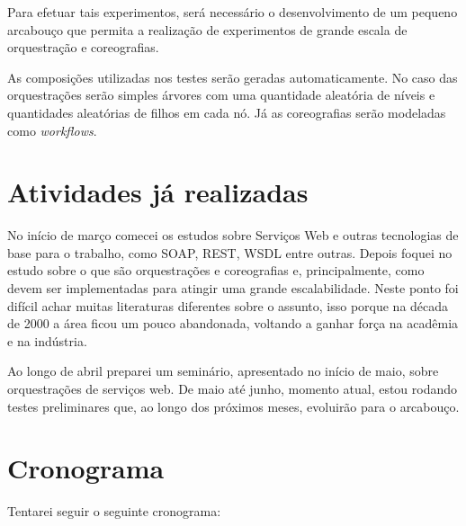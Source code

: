 \documentclass[11pt,a4paper]{article}
\begin{document}
Para efetuar tais experimentos, será necessário o desenvolvimento de um pequeno arcabouço que permita a realização de experimentos de grande escala de orquestração e coreografias. 

As composições utilizadas nos testes serão geradas automaticamente. No caso das orquestrações serão simples árvores com uma quantidade aleatória de níveis e quantidades aleatórias de filhos em cada nó. Já as coreografias serão modeladas como \textit{workflows}.

\section{Atividades já realizadas}
No início de março comecei os estudos sobre Serviços Web e outras tecnologias de base para o trabalho, como SOAP, REST, WSDL entre outras. Depois foquei no estudo sobre o que são orquestrações e coreografias e, principalmente, como devem ser implementadas para atingir uma grande escalabilidade. Neste ponto foi difícil achar muitas literaturas diferentes sobre o assunto, isso porque na década de 2000 a área ficou um pouco abandonada, voltando a ganhar força na acadêmia e na indústria.

Ao longo de abril preparei um seminário, apresentado no início de maio, sobre orquestrações de serviços web. De maio até junho, momento atual, estou rodando testes preliminares que, ao longo dos próximos meses, evoluirão para o arcabouço.

\section{Cronograma}
Tentarei seguir o seguinte cronograma:
\end{document}
